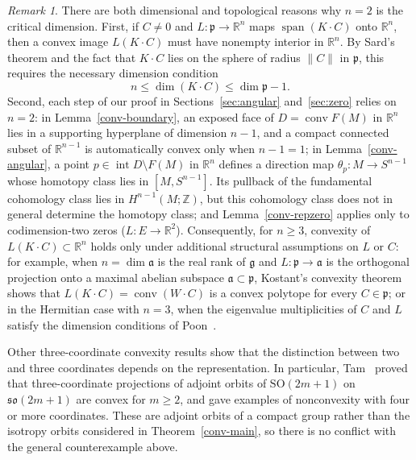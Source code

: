 \documentclass[11pt,reqno]{amsart}
\theoremstyle{remark}
\newtheorem{remark}[theorem]{Remark}
\newcommand{\R}{\mathbb R}
\newcommand{\Z}{\mathbb Z}
\newcommand{\gfr}{\mathfrak g}
\newcommand{\pfr}{\mathfrak p}
\DeclareMathOperator{\conv}{conv}
\begin{document}
\begin{remark}
There are both dimensional and topological reasons why $n=2$ is the
critical dimension. First, if $C\ne0$ and $L:\pfr\to\R^n$ maps
$\operatorname{span}(K\cdot C)$ onto $\R^n$, then a convex image
$L(K\cdot C)$ must have nonempty interior in $\R^n$. By Sard's theorem
and the fact that $K\cdot C$ lies on the sphere of radius $\|C\|$ in
$\pfr$, this requires the necessary dimension condition
\[
 n\le\dim(K\cdot C)\le\dim\pfr-1.
\]
Second, each step of our proof in Sections~\ref{sec:angular}
and~\ref{sec:zero} relies on $n=2$: in Lemma~\ref{conv-boundary}, an
exposed face of $D=\conv F(M)$ in $\R^n$ lies in a supporting hyperplane
of dimension $n-1$, and a compact connected subset of $\R^{n-1}$ is
automatically convex only when $n-1=1$; in Lemma~\ref{conv-angular}, a
point $p\in\operatorname{int}D\setminus F(M)$ in $\R^n$ defines a
direction map $\theta_p:M\to S^{n-1}$ whose homotopy class lies in
$[M,S^{n-1}]$. Its pullback of the fundamental cohomology class lies
in $H^{n-1}(M;\Z)$, but this cohomology class does not in general
determine the homotopy class; and Lemma~\ref{conv-repzero} applies only
to codimension-two zeros ($L:E\to\R^2$). Consequently, for $n\ge3$,
convexity of $L(K\cdot C)\subset\R^n$ holds only under additional
structural assumptions on $L$ or $C$: for example, when
$n=\dim\mathfrak{a}$ is the real rank of $\gfr$ and
$L:\pfr\to\mathfrak{a}$ is the orthogonal projection onto a maximal
abelian subspace $\mathfrak{a}\subset\pfr$, Kostant's convexity
theorem~\cite{Kostant1973} shows that $L(K\cdot C)=\conv(W\cdot C)$ is a
convex polytope for every $C\in\pfr$; or in the Hermitian case with
$n=3$, when the eigenvalue multiplicities of $C$ and $L$ satisfy the
dimension conditions of Poon~\cite{Poon1997}.

Other three-coordinate convexity results show that the distinction
between two and three coordinates depends on the representation.
In particular, Tam~\cite{Tam1999} proved that three-coordinate
projections of adjoint orbits of $\mathrm{SO}(2m+1)$ on
$\mathfrak{so}(2m+1)$ are convex for $m\ge2$, and gave examples of
nonconvexity with four or more coordinates. These are adjoint orbits of
a compact group rather than the isotropy orbits considered in
Theorem~\ref{conv-main}, so there is no conflict with the general
counterexample above.
\end{remark}
\end{document}
